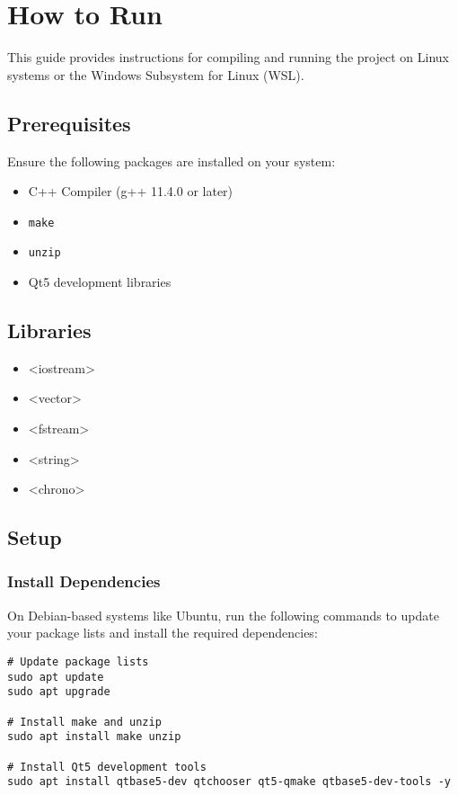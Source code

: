 \section{How to Run}

This guide provides instructions for compiling and running the project on Linux systems or the Windows Subsystem for Linux (WSL).

\subsection{Prerequisites}

Ensure the following packages are installed on your system:
\begin{itemize}
    \item C++ Compiler (g++ 11.4.0 or later)
    \item \texttt{make}
    \item \texttt{unzip}
    \item Qt5 development libraries
\end{itemize}

\subsection{Libraries}
\begin{itemize}
    \item <iostream>
    \item <vector>
    \item <fstream>
    \item <string>
    \item <chrono>
\end{itemize}

\subsection{Setup}

\subsubsection{Install Dependencies}

On Debian-based systems like Ubuntu, run the following commands to update your package lists and install the required dependencies:

\begin{verbatim}
# Update package lists
sudo apt update
sudo apt upgrade

# Install make and unzip
sudo apt install make unzip

# Install Qt5 development tools
sudo apt install qtbase5-dev qtchooser qt5-qmake qtbase5-dev-tools -y 
\end{verbatim}

